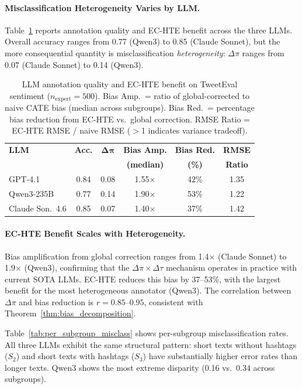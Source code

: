 \documentclass[11pt,a4paper]{article}
\begin{document}
\paragraph{Misclassification Heterogeneity Varies by LLM.}
Table~\ref{tab:llm_comparison} reports annotation quality and EC-HTE benefit across the three LLMs.
Overall accuracy ranges from 0.77 (Qwen3) to 0.85 (Claude Sonnet), but the more consequential quantity is misclassification \emph{heterogeneity}: $\Delta\pi$ ranges from 0.07 (Claude Sonnet) to 0.14 (Qwen3).

\begin{table}[t]
\centering
\small
\begin{tabular}{lccccc}
\toprule
\textbf{LLM} & \textbf{Acc.} & $\boldsymbol{\Delta\pi}$ & \textbf{Bias Amp.} & \textbf{Bias Red.} & \textbf{RMSE} \\
 & & & \textbf{(median)} & \textbf{(\%)} & \textbf{Ratio} \\
\midrule
GPT-4.1 & 0.84 & 0.08 & 1.55$\times$ & 42\% & 1.35 \\
Qwen3-235B & 0.77 & 0.14 & 1.90$\times$ & 53\% & 1.22 \\
Claude Son.~4.6 & 0.85 & 0.07 & 1.40$\times$ & 37\% & 1.42 \\
\bottomrule
\end{tabular}
\caption{LLM annotation quality and EC-HTE benefit on TweetEval sentiment ($n_{\text{expert}}=500$). Bias Amp.\ = ratio of global-corrected to naive CATE bias (median across subgroups). Bias Red.\ = percentage bias reduction from EC-HTE vs.\ global correction. RMSE Ratio = EC-HTE RMSE / naive RMSE ($>$1 indicates variance tradeoff).}
\label{tab:llm_comparison}
\end{table}

\paragraph{EC-HTE Benefit Scales with Heterogeneity.}
Bias amplification from global correction ranges from 1.4$\times$ (Claude Sonnet) to 1.9$\times$ (Qwen3), confirming that the $\Delta\pi \times \Delta\tau$ mechanism operates in practice with current SOTA LLMs.
EC-HTE reduces this bias by 37--53\%, with the largest benefit for the most heterogeneous annotator (Qwen3).
The correlation between $\Delta\pi$ and bias reduction is $r = 0.85$--$0.95$, consistent with Theorem~\ref{thm:bias_decomposition}.

Table~\ref{tab:per_subgroup_misclass} shows per-subgroup misclassification rates.
All three LLMs exhibit the same structural pattern: short texts without hashtags ($S_2$) and short texts with hashtags ($S_3$) have substantially higher error rates than longer texts.
Qwen3 shows the most extreme disparity (0.16 vs.\ 0.34 across subgroups).
\end{document}
